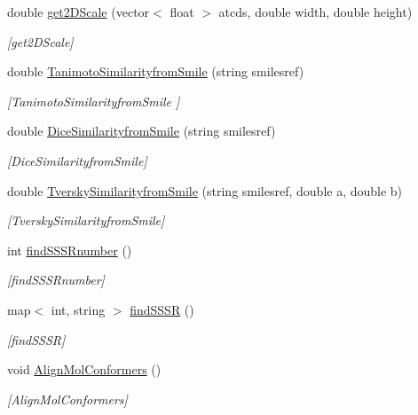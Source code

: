 \begin{DoxyCompactItemize}
double \mbox{\hyperlink{class_molecule_ac36056d9d2c1f09d25f70abdd88e7233}{get2\+D\+Scale}} (vector$<$ float $>$ atcds, double width, double height)
\begin{DoxyCompactList}\small\item\em \mbox{[}get2\+D\+Scale\mbox{]} \end{DoxyCompactList}\item 
double \mbox{\hyperlink{class_molecule_a2f83a282a6276fb330b46831a29907d6}{Tanimoto\+Similarityfrom\+Smile}} (string smilesref)
\begin{DoxyCompactList}\small\item\em \mbox{[}Tanimoto\+Similarityfrom\+Smile \mbox{]} \end{DoxyCompactList}\item 
double \mbox{\hyperlink{class_molecule_a5dcf9622623a09d43d9a2bc9d381a67e}{Dice\+Similarityfrom\+Smile}} (string smilesref)
\begin{DoxyCompactList}\small\item\em \mbox{[}Dice\+Similarityfrom\+Smile\mbox{]} \end{DoxyCompactList}\item 
double \mbox{\hyperlink{class_molecule_ae2126d53ee2e1488eb7d105c6b02a604}{Tversky\+Similarityfrom\+Smile}} (string smilesref, double a, double b)
\begin{DoxyCompactList}\small\item\em \mbox{[}Tversky\+Similarityfrom\+Smile\mbox{]} \end{DoxyCompactList}\item 
int \mbox{\hyperlink{class_molecule_aaca41709fb5306fbfd11f4a75664e2ed}{find\+S\+S\+S\+Rnumber}} ()
\begin{DoxyCompactList}\small\item\em \mbox{[}find\+S\+S\+S\+Rnumber\mbox{]} \end{DoxyCompactList}\item 
map$<$ int, string $>$ \mbox{\hyperlink{class_molecule_a553c6c6f1543156da2ff00c859f6b508}{find\+S\+S\+SR}} ()
\begin{DoxyCompactList}\small\item\em \mbox{[}find\+S\+S\+SR\mbox{]} \end{DoxyCompactList}\item 
void \mbox{\hyperlink{class_molecule_adc6886a60ec1e7f55ba07d7f2be72e68}{Align\+Mol\+Conformers}} ()
\begin{DoxyCompactList}\small\item\em \mbox{[}Align\+Mol\+Conformers\mbox{]} \end{DoxyCompactList}\item 

\end{DoxyCompactItemize}
